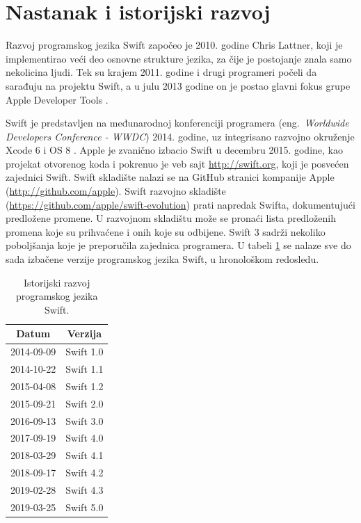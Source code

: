 \documentclass[a4paper]{article}
\begin{document}
\section{Nastanak i istorijski razvoj}
\label{sec:prviDeo}

Razvoj programskog jezika Swift započeo je 2010. godine Chris Lattner, koji je implementirao veći deo osnovne strukture jezika, za čije je postojanje znala samo nekolicina ljudi. Tek su krajem 2011. godine i drugi programeri počeli da sarađuju na projektu Swift, a u julu 2013 godine on je postao glavni fokus grupe Apple Developer Tools \cite{mastering_swift3}. 

Swift je predstavljen na međunarodnoj konferenciji programera (eng.~{\em Worldwide Developers Conference - WWDC}) 2014. godine, uz integrisano razvojno okruženje Xcode 6 i OS 8 \cite{thenextweb_sajt}. Apple je zvanično izbacio Swift u decembru 2015. godine, kao projekat otvorenog koda i pokrenuo je veb sajt \url{http://swift.org}, koji je posvećen zajednici Swift. Swift skladište nalazi  se na GitHub stranici kompanije Apple (\url{http://github.com/apple}). Swift razvojno skladište (\url{https://github.com/apple/swift-evolution}) prati napredak Swifta, dokumentujući predložene promene. U razvojnom skladištu može  se pronaći lista predloženih promena koje su prihvaćene i onih koje su odbijene. Swift 3 sadrži nekoliko poboljšanja koje je preporučila zajednica programera. U tabeli \ref{tab:tabela1} se nalaze sve do sada izbačene verzije programskog jezika Swift, u hronološkom redosledu.

\begin{table}[h!]
\begin{center}
\caption{Istorijski razvoj programskog jezika Swift.}
\begin{tabular}{|c|c|} \hline
\label{tab:tabela1}
Datum & Verzija \\ \hline
2014-09-09 & Swift 1.0 \\ \hline
2014-10-22 & Swift 1.1 \\ \hline
2015-04-08 & Swift 1.2 \\ \hline
2015-09-21 & Swift 2.0 \\ \hline
2016-09-13 & Swift 3.0 \\ \hline
2017-09-19 & Swift 4.0 \\ \hline
2018-03-29 & Swift 4.1 \\ \hline
2018-09-17 & Swift 4.2 \\ \hline
2019-02-28 & Swift 4.3 \\ \hline
2019-03-25 & Swift 5.0 \\ \hline
\end{tabular}
\end{center}
\end{table}
\end{document}
